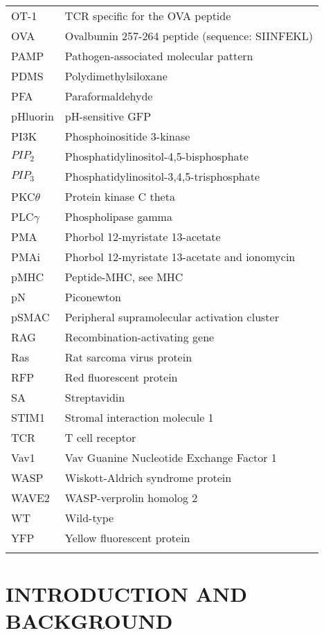 \documentclass[phd,tocprelim]{cornell}
\begin{document}
\begin{longtable}{ p{} p{} }
	OT-1 & TCR specific for the OVA peptide \\
	OVA & Ovalbumin 257-264 peptide (sequence: SIINFEKL) \\
	PAMP & Pathogen-associated molecular pattern \\
	PDMS & Polydimethylsiloxane \\
	PFA & Paraformaldehyde \\
	pHluorin & pH-sensitive GFP \\
	PI3K & Phosphoinositide 3-kinase \\
	$PIP_2$ & Phosphatidylinositol-4,5-bisphosphate \\
	$PIP_3$ & Phosphatidylinositol-3,4,5-trisphosphate \\
	PKC$\theta$ & Protein kinase C theta \\
	PLC$\gamma$ & Phospholipase gamma \\
	PMA & Phorbol 12-myristate 13-acetate \\
	PMAi & Phorbol 12-myristate 13-acetate and ionomycin \\
	pMHC & Peptide-MHC, see MHC \\
	pN & Piconewton \\
	pSMAC & Peripheral supramolecular activation cluster \\
	RAG & Recombination-activating gene \\
	Ras & Rat sarcoma virus protein \\
	RFP & Red fluorescent protein \\
	SA & Streptavidin \\
	STIM1 & Stromal interaction molecule 1 \\
	TCR & T cell receptor \\
	Vav1 & Vav Guanine Nucleotide Exchange Factor 1 \\
	WASP & Wiskott-Aldrich syndrome protein \\
	WAVE2 & WASP-verprolin homolog 2 \\
	WT & Wild-type \\
	YFP & Yellow fluorescent protein \\
	\label{tab:abbreviations}
\end{longtable}
%

\normalspacing \setcounter{page}{1} 
\pagestyle{cornell} \addtolength{\parskip}{0.5\baselineskip}

\chapter{INTRODUCTION AND BACKGROUND}

\end{document}
